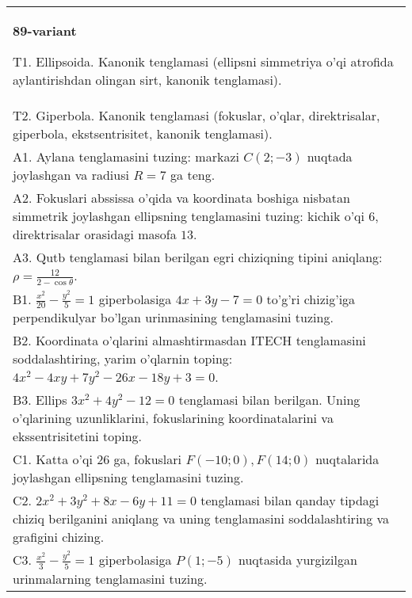 \documentclass{article}
\begin{document}
\begin{tabular}{m{17cm}}
\textbf{89-variant}
\newline

T1. Ellipsoida. Kanonik tenglamasi (ellipsni simmetriya o'qi atrofida aylantirishdan olingan sirt, kanonik tenglamasi).\\

T2. Giperbola. Kanonik tenglamasi (fokuslar, o'qlar, direktrisalar, giperbola, ekstsentrisitet, kanonik tenglamasi).\\

A1. Aylana tenglamasini tuzing: markazi $C(2;-3)$ nuqtada joylashgan va radiusi $R=7$ ga teng.\\

A2. Fokuslari abssissa o'qida va koordinata boshiga nisbatan simmetrik joylashgan ellipsning tenglamasini tuzing: kichik o'qi $6$, direktrisalar orasidagi masofa $13$.\\

A3. Qutb tenglamasi bilan berilgan egri chiziqning tipini aniqlang: $\rho=\frac{12}{2-\cos\theta}$.\\

B1. $\frac{x^{2}}{20} - \frac{y^{2}}{5} = 1$ giperbolasiga $4x + 3y - 7 = 0$ to'g'ri chizig'iga perpendikulyar bo'lgan urinmasining tenglamasini tuzing.  \\

B2. Koordinata o'qlarini almashtirmasdan ITECH tenglamasini soddalashtiring, yarim o'qlarnin toping: $4x^{2} - 4xy + 7y^{2} - 26x - 18y + 3 = 0$.\\

B3. Ellips $3x^{2} + 4y^{2} - 12 = 0$ tenglamasi bilan berilgan. Uning o'qlarining uzunliklarini, fokuslarining koordinatalarini va ekssentrisitetini toping.  \\

C1. Katta o'qi 26 ga, fokuslari $F( - 10;0), F(14;0)$ nuqtalarida joylashgan ellipsning tenglamasini tuzing.  \\

C2. $2x^{2} + 3y^{2} + 8x - 6y + 11 = 0$ tenglamasi bilan qanday tipdagi chiziq berilganini aniqlang va uning tenglamasini soddalashtiring va grafigini chizing.  \\

C3. $\frac{x^{2}}{3} - \frac{y^{2}}{5} = 1$ giperbolasiga $P(1; - 5)$ nuqtasida yurgizilgan urinmalarning tenglamasini tuzing.\\

\end{tabular}
\vspace{1cm}
\end{document}
